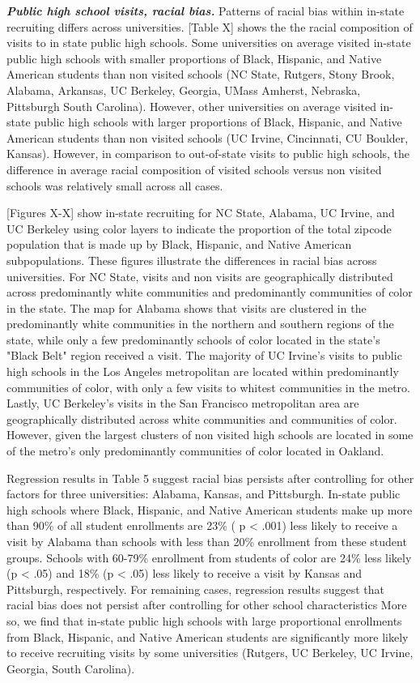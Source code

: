 \documentclass[twoside]{article}
\begin{document}
\textbf{\textit{Public high school visits, racial bias.}} Patterns of racial bias within in-state recruiting differs across universities. [Table X] shows the the racial composition of visits to in state public high schools. Some universities on average visited in-state public high schools with smaller proportions of Black, Hispanic, and Native American students than non visited schools (NC State, Rutgers, Stony Brook, Alabama, Arkansas, UC Berkeley, Georgia, UMass Amherst, Nebraska, Pittsburgh South Carolina). However, other universities on average visited in-state public high schools with larger proportions of Black,  Hispanic, and Native American students than non visited schools (UC Irvine, Cincinnati, CU Boulder, Kansas). However, in comparison to out-of-state visits to public high schools, the difference in average racial composition of visited schools versus non visited schools was relatively small across all cases.

[Figures X-X] show in-state recruiting for NC State, Alabama, UC Irvine, and UC Berkeley using color layers to indicate the proportion of the total zipcode population that is made up by Black, Hispanic, and Native American subpopulations. These figures illustrate the differences in racial bias across universities. For NC State, visits and non visits are geographically distributed across predominantly white communities and predominantly communities of color in the state. The map for Alabama shows that visits are clustered in the predominantly white communities in the northern and southern regions of the state, while only a few predominantly schools of color located in the state's "Black Belt" region received a visit. The majority of UC Irvine's visits to public high schools in the Los Angeles metropolitan are located within predominantly communities of color, with only a few visits to whitest communities in the metro. Lastly, UC Berkeley's visits in the San Francisco metropolitan area are geographically distributed across white communities and communities of color. However, given  the largest clusters of non visited high schools are located in some of the metro's only predominantly communities of color located in Oakland.

Regression results in Table 5 suggest racial bias persists after controlling for other factors for three universities: Alabama, Kansas, and Pittsburgh. In-state public high schools where Black, Hispanic, and Native American students make up more than  90\% of all student enrollments are 23\% ( p < .001) less likely to receive a visit by Alabama than schools with less than 20\% enrollment from these student groups. Schools with 60-79\% enrollment from students of color are 24\% less likely (p < .05) and 18\% (p < .05) less likely to receive a visit by Kansas and Pittsburgh, respectively. For remaining cases, regression results suggest that racial bias does not persist after controlling for other school characteristics More so, we find that in-state public high schools with large proportional enrollments from Black, Hispanic, and Native American students are significantly more likely to receive recruiting visits by some universities (Rutgers, UC Berkeley, UC Irvine, Georgia, South Carolina).
\end{document}
